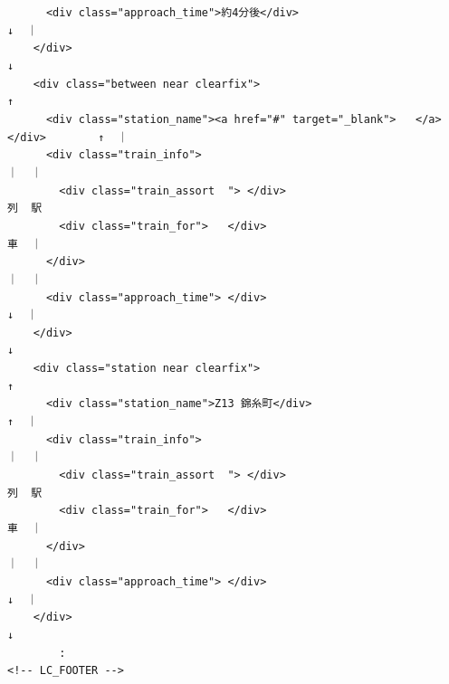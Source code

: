 \begin{frameboxit}{160.0mm}
	\verb|      <div class="approach_time">約4分後</div>                                  ↓  ｜| \\
	\verb|    </div>                                                                          ↓| \\
	\verb|    <div class="between near clearfix">                                             ↑| \\
	\verb|      <div class="station_name"><a href="#" target="_blank">   </a></div>        ↑  ｜| \\
	\verb|      <div class="train_info">                                                  ｜  ｜| \\
	\verb|        <div class="train_assort  "> </div>                                      列  駅| \\
	\verb|        <div class="train_for">   </div>                                         車  ｜| \\
	\verb|      </div>                                                                    ｜  ｜| \\
	\verb|      <div class="approach_time"> </div>                                         ↓  ｜| \\
	\verb|    </div>                                                                          ↓| \\
	\verb|    <div class="station near clearfix">                                             ↑| \\
	\verb|      <div class="station_name">Z13 錦糸町</div>                                 ↑  ｜| \\
	\verb|      <div class="train_info">                                                  ｜  ｜| \\
	\verb|        <div class="train_assort  "> </div>                                      列  駅| \\
	\verb|        <div class="train_for">   </div>                                         車  ｜| \\
	\verb|      </div>                                                                    ｜  ｜| \\
	\verb|      <div class="approach_time"> </div>                                         ↓  ｜| \\
	\verb|    </div>                                                                          ↓| \\
	\verb|        :                                                                             | \\
	\verb|<!-- LC_FOOTER -->                                                                    | \\
\end{frameboxit}

